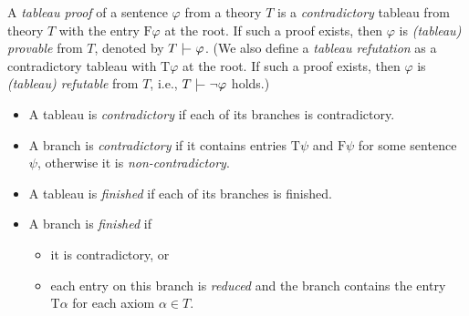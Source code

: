 \begin{definition}
    A \emph{tableau proof} of a sentence $\varphi$ from a theory $T$ is a \emph{contradictory} tableau from theory $T$ with the entry $\mathrm{F}\varphi$ at the root. If such a proof exists, then $\varphi$ is \emph{(tableau) provable} from $T$, denoted by $T\proves\varphi$. (We also define a \emph{tableau refutation} as a contradictory tableau with $\mathrm{T}\varphi$ at the root. If such a proof exists, then $\varphi$ is \emph{(tableau) refutable} from $T$, i.e., $T\proves\neg\varphi$ holds.)  
    \begin{itemize}
        \item A tableau is \emph{contradictory} if each of its branches is contradictory.
        \item A branch is \emph{contradictory} if it contains entries $\mathrm{T}\psi$ and $\mathrm{F}\psi$ for some sentence $\psi$, otherwise it is \emph{non-contradictory}.
        \item A tableau is \emph{finished} if each of its branches is finished.
        \item A branch is \emph{finished} if 
        \begin{itemize}
            \item it is contradictory, or
            \item each entry on this branch is \emph{reduced} and the branch contains the entry $\mathrm{T}\alpha$ for each axiom $\alpha\in T$.
        \end{itemize}
         

\end{itemize}
\end{definition}
